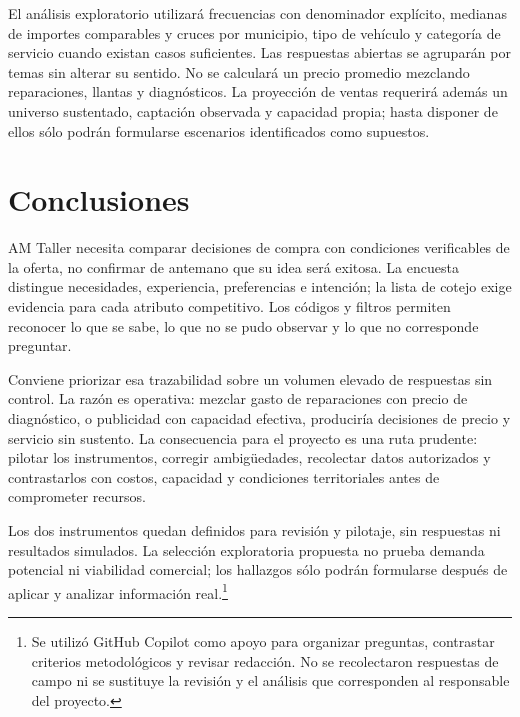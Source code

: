 {El análisis exploratorio utilizará frecuencias con denominador explícito, medianas de importes comparables y cruces por municipio, tipo de vehículo y categoría de servicio cuando existan casos suficientes. Las respuestas abiertas se agruparán por temas sin alterar su sentido. No se calculará un precio promedio mezclando reparaciones, llantas y diagnósticos. La proyección de ventas requerirá además un universo sustentado, captación observada y capacidad propia; hasta disponer de ellos sólo podrán formularse escenarios identificados como supuestos.

\clearpage
\section{Conclusiones}

AM Taller necesita comparar decisiones de compra con condiciones verificables de la oferta, no confirmar de antemano que su idea será exitosa. La encuesta distingue necesidades, experiencia, preferencias e intención; la lista de cotejo exige evidencia para cada atributo competitivo. Los códigos y filtros permiten reconocer lo que se sabe, lo que no se pudo observar y lo que no corresponde preguntar.

Conviene priorizar esa trazabilidad sobre un volumen elevado de respuestas sin control. La razón es operativa: mezclar gasto de reparaciones con precio de diagnóstico, o publicidad con capacidad efectiva, produciría decisiones de precio y servicio sin sustento. La consecuencia para el proyecto es una ruta prudente: pilotar los instrumentos, corregir ambigüedades, recolectar datos autorizados y contrastarlos con costos, capacidad y condiciones territoriales antes de comprometer recursos.

Los dos instrumentos quedan definidos para revisión y pilotaje, sin respuestas ni resultados simulados. La selección exploratoria propuesta no prueba demanda potencial ni viabilidad comercial; los hallazgos sólo podrán formularse después de aplicar y analizar información real.\footnote{Se utilizó GitHub Copilot como apoyo para organizar preguntas, contrastar criterios metodológicos y revisar redacción. No se recolectaron respuestas de campo ni se sustituye la revisión y el análisis que corresponden al responsable del proyecto.}
}

